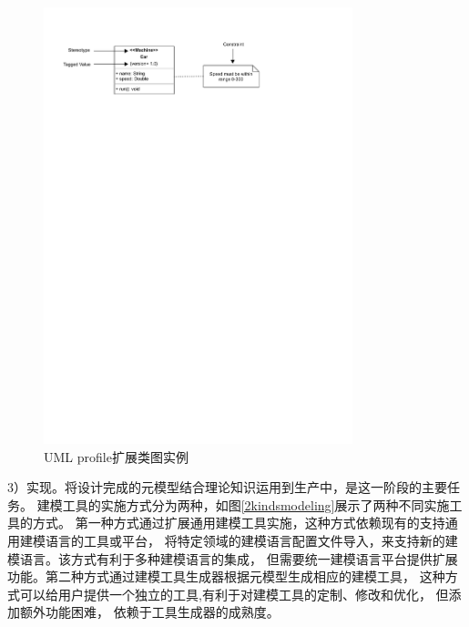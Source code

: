 \begin{figure}[!htbp] %
    \centering %
    \includegraphics[width=0.8\textwidth]{FIGs/chapter3/UMLprofileexample.pdf} %
    \caption{UML profile扩展类图实例} %
    \label{UMLprofileexample} %
\end{figure}%

3）实现。将设计完成的元模型结合理论知识运用到生产中，是这一阶段的主要任务。
建模工具的实施方式分为两种，如图\ref{2kindsmodeling}展示了两种不同实施工具的方式。
第一种方式通过扩展通用建模工具实施，这种方式依赖现有的支持通用建模语言的工具或平台，
将特定领域的建模语言配置文件导入，来支持新的建模语言。该方式有利于多种建模语言的集成，
但需要统一建模语言平台提供扩展功能。第二种方式通过建模工具生成器根据元模型生成相应的建模工具，
这种方式可以给用户提供一个独立的工具,有利于对建模工具的定制、修改和优化，
但添加额外功能困难， 依赖于工具生成器的成熟度\cite{刘辉2008元建模技术研究进展}。


